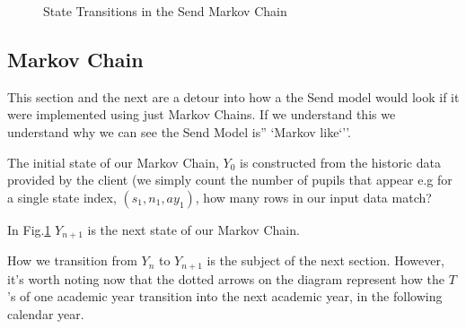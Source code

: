 \documentclass[margin=5mm]{article}
\begin{document}
\begin{figure}[h!]
  \caption{State Transitions in the Send Markov Chain\label{state}
  }
\end{figure}

\subsection{Markov Chain}

This section and the next are a detour into how a the Send model would
look if it were implemented using just Markov Chains.  If we
understand this we understand why we can see the Send Model is''
`Markov like`''.

The initial state of our Markov Chain, $Y_0$ is constructed from the
historic data provided by the client (we simply count the number of
pupils that appear e.g for a single state index, $(s_1,n_1,ay_1)$, how
many rows in our input data match?

In Fig.\ref{state} $Y_{n+1}$ is the next state of our Markov Chain.

How we transition from $Y_{n}$ to $Y_{n+1}$ is the subject of the next
section.  However, it's worth noting now that the dotted arrows on the
diagram represent how the $T$'s of one academic year transition into
the next academic year, in the following calendar year.
\end{document}
